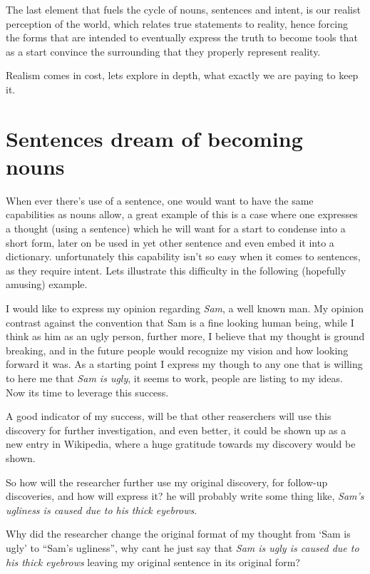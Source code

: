 \documentclass[10pt]{article}
\begin{document}
The last element that fuels the cycle of nouns, sentences and intent, is our realist perception of the world, which relates true statements to reality, hence forcing the forms that are intended to eventually express the truth to become tools that as a start convince the surrounding that they properly represent reality.\par
Realism comes in cost, lets explore in depth, what exactly we are paying to keep it.

\newpage 
\section*{Sentences dream of becoming nouns}

When ever there’s use of a sentence, one would want to have the same capabilities as nouns allow, a great example of this is a case where one expresses a thought (using a sentence) which he will  want  for a start to condense  into a short form, later on be used in yet other sentence and even  embed it into a dictionary. unfortunately this capability isn't so easy when it comes to sentences, as they require intent. Lets illustrate this difficulty in the following (hopefully amusing) example.\par
I would like to express my opinion regarding \textit{Sam}, a well known man. My opinion contrast against the  convention that Sam is a fine looking human being, while I think as him as an ugly person, further more, I believe that  my thought is ground breaking, and in the future people would recognize my vision and how looking forward it was. As a starting point I express my though to any one that is willing to here me that \textit{Sam is ugly}, it seems to work, people are listing to my ideas. Now its time to leverage this success.\par
A good indicator of my success, will be that  other reaserchers will use this discovery for further investigation, and even better, it could be shown up as a new entry in Wikipedia, where a huge gratitude towards my discovery would be shown.\par
So how will the researcher further use my original discovery, for follow-up discoveries, and how will express it?  he will probably write some thing like, \textit{Sam's ugliness is caused due to his thick eyebrows}.
\par
Why did the researcher change the original format of my thought from ‘Sam is ugly’ to “Sam’s ugliness”, why cant he just say that \textit{Sam is ugly  is caused due to his thick eyebrows} leaving my original sentence in its original form?
\end{document}
